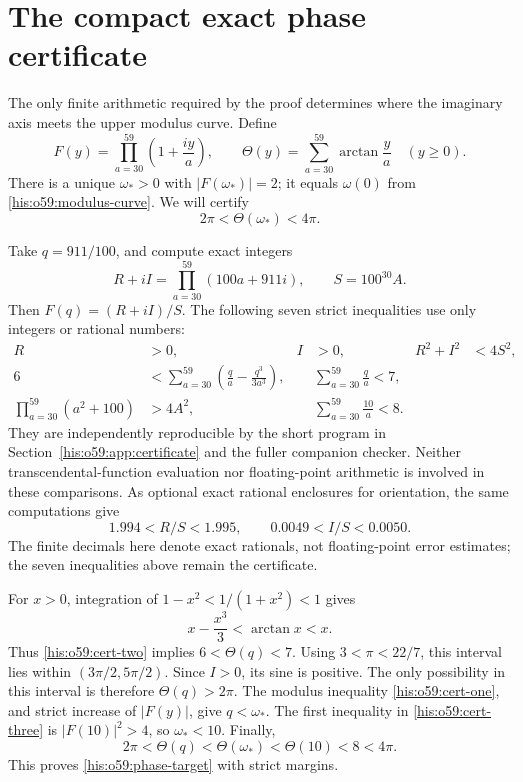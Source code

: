 \documentclass[11pt]{article}
\theoremstyle{remark}\newtheorem{remark}[theorem]{Remark}
\numberwithin{equation}{section}
\begin{document}
\section{The compact exact phase certificate}\label{his:o59:sec:certificate}
The only finite arithmetic required by the proof determines where the
imaginary axis meets the upper modulus curve. Define
\begin{equation}\label{his:o59:Fdef}
F(y)=\prod_{a=30}^{59}\left(1+\frac{iy}{a}\right),\qquad
\Theta(y)=\sum_{a=30}^{59}\arctan\frac ya\quad(y\ge0).
\end{equation}
There is a unique $\omega_*>0$ with $|F(\omega_*)|=2$; it equals
$\omega(0)$ from \eqref{his:o59:modulus-curve}. We will certify
\begin{equation}\label{his:o59:phase-target}
2\pi<\Theta(\omega_*)<4\pi.
\end{equation}

Take $q=911/100$, and compute exact integers
\begin{equation}\label{his:o59:gaussian-product}
R+iI=\prod_{a=30}^{59}(100a+911i),\qquad S=100^{30}A.
\end{equation}
Then $F(q)=(R+iI)/S$. The following seven strict inequalities use only
integers or rational numbers:
\begin{align}
R&>0, & I&>0, & R^2+I^2&<4S^2,\label{his:o59:cert-one}\\
6&<\sum_{a=30}^{59}\left(\frac qa-\frac{q^3}{3a^3}\right),
&&\sum_{a=30}^{59}\frac qa<7,\label{his:o59:cert-two}\\
\prod_{a=30}^{59}(a^2+100)&>4A^2,
&&\sum_{a=30}^{59}\frac{10}{a}<8.\label{his:o59:cert-three}
\end{align}
They are independently reproducible by the short program in
Section~\ref{his:o59:app:certificate} and the fuller companion checker.
Neither transcendental-function evaluation nor floating-point
arithmetic is involved in these comparisons. As optional exact rational
enclosures for orientation, the same computations give
\[
1.994<R/S<1.995,\qquad 0.0049<I/S<0.0050.
\]
The finite decimals here denote exact rationals, not floating-point
error estimates; the seven inequalities above remain the certificate.

For $x>0$, integration of
$1-x^2<1/(1+x^2)<1$ gives
\[
x-\frac{x^3}{3}<\arctan x<x.
\]
Thus \eqref{his:o59:cert-two} implies $6<\Theta(q)<7$.
Using $3<\pi<22/7$, this interval lies within
$(3\pi/2,5\pi/2)$. Since $I>0$, its sine is positive. The only
possibility in this interval is therefore $\Theta(q)>2\pi$.
The modulus inequality \eqref{his:o59:cert-one}, and strict increase of
$|F(y)|$, give $q<\omega_*$. The first inequality in
\eqref{his:o59:cert-three} is $|F(10)|^2>4$, so $\omega_*<10$.
Finally,
\begin{equation}\label{his:o59:certificate-chain}
2\pi<\Theta(q)<\Theta(\omega_*)<\Theta(10)<8<4\pi.
\end{equation}
This proves \eqref{his:o59:phase-target} with strict margins.
\end{document}
